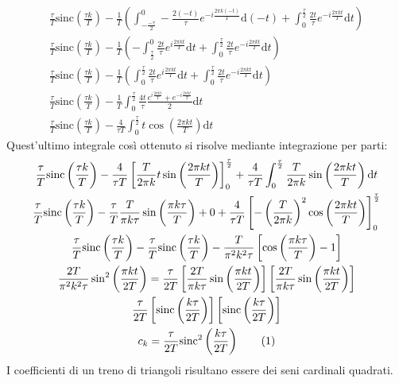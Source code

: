 \documentclass{article}
\newcommand{\sinc}{\mathrm{sinc}}
\newcommand{\df}{\mathrm{d}}
\newcommand{\tageq}{\tag{\stepcounter{equation}\theequation}}
\begin{document}
\begin{gather*}
    \displaystyle\frac{\tau}{T}\sinc\left(\frac{\tau k}{T}\right)-\frac{1}{T}\left(\int_{-\frac{-\tau}{2}}^{0}-\frac{2(-t)}{\tau}e^{-i\frac{2\pi k(-t)}{T}}\df(-t)+\int_{0}^{\frac{\tau}{2}}\frac{2t}{\tau}e^{-i\frac{2\pi kt}{T}}\df t\right)\\
    \displaystyle\frac{\tau}{T}\sinc\left(\frac{\tau k}{T}\right)-\frac{1}{T}\left(-\int_{\frac{\tau}{2}}^{0}\frac{2t}{\tau}e^{i\frac{2\pi kt}{T}}\df t+\int_{0}^{\frac{\tau}{2}}\frac{2t}{\tau}e^{-i\frac{2\pi kt}{T}}\df t\right)\\
    \displaystyle\frac{\tau}{T}\sinc\left(\frac{\tau k}{T}\right)-\frac{1}{T}\left(\int^{\frac{\tau}{2}}_{0}\frac{2t}{\tau}e^{i\frac{2\pi kt}{T}}\df t+\int_{0}^{\frac{\tau}{2}}\frac{2t}{\tau}e^{-i\frac{2\pi kt}{T}}\df t\right)\\
    \displaystyle\frac{\tau}{T}\sinc\left(\frac{\tau k}{T}\right)-\frac{1}{T}\int^{\frac{\tau}{2}}_{0}\frac{4t}{\tau}\frac{e^{i\frac{2\pi kt}{T}}+e^{-i\frac{2\pi kt}{T}}}{2}\df t\\
    \displaystyle\frac{\tau}{T}\sinc\left(\frac{\tau k}{T}\right)-\frac{4}{\tau T}\int_{0}^{\frac{\tau}{2}}t\cos\left(\frac{2\pi kt}{T}\right)\df t
\end{gather*}
Quest'ultimo integrale così ottenuto si risolve mediante integrazione per parti:
\begin{gather*}
    \displaystyle\frac{\tau}{T}\sinc\left(\frac{\tau k}{T}\right)-\frac{4}{\tau T}\left[\frac{T}{2\pi k}t\sin\left(\frac{2\pi kt}{T}\right)\right]^{\frac{\tau}{2}}_0
    +\frac{4}{\tau T}\int_{0}^{\frac{\tau}{2}}\frac{T}{2\pi k}\sin\left(\frac{2\pi kt}{T}\right)\df t\\
    \displaystyle\frac{\tau}{T}\sinc\left(\frac{\tau k}{T}\right)-\frac{\tau}{T}\frac{T}{\pi k\tau}\sin\left(\frac{\pi k\tau}{T}\right)+0+
    \frac{4}{\tau T}\left[-\left(\frac{T}{2\pi k}\right)^2\cos\left(\frac{2\pi kt}{T}\right)\right]^{\frac{\tau}{2}}_0\\
    \displaystyle\frac{\tau}{T}\sinc\left(\frac{\tau k}{T}\right)-\displaystyle\frac{\tau}{T}\sinc\left(\frac{\tau k}{T}\right)-
    \frac{T}{\pi^2k^2\tau}\left[\cos\left(\frac{\pi k\tau}{T}\right)-1\right]\\
    \displaystyle\frac{2T}{\pi^2k^2\tau}\sin^2\left(\frac{\pi kt}{2T}\right)=
    \frac{\tau}{2T}\left[\frac{2T}{\pi k\tau}\sin\left(\frac{\pi kt}{2T}\right)\right]\left[\frac{2T}{\pi k\tau}\sin\left(\frac{\pi kt}{2T}\right)\right]\\
    \displaystyle\frac{\tau}{2T}\left[\sinc\left(\frac{k\tau}{2T}\right)\right]\left[\sinc\left(\frac{k\tau}{2T}\right)\right]\\
    c_k=\displaystyle\frac{\tau}{2T}\sinc^2\left(\frac{k\tau }{2T}\right)\tageq
\end{gather*}
I coefficienti di un treno di triangoli risultano essere dei seni cardinali quadrati. 
\end{document}
